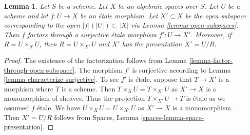 \documentclass[10pt,a4paper]{amsart}
\theoremstyle{plain}
\newtheorem{lemma}[subsection]{Lemma}
\theoremstyle{definition}
\theoremstyle{remark}
\numberwithin{equation}{subsection}
\begin{document}
\begin{lemma}
\label{lemma-etale-image-open}
Let $S$ be a scheme. Let $X$ be an algebraic spaces over $S$.
Let $U$ be a scheme and let $f : U \to X$ be an \'etale morphism.
Let $X' \subset X$ be the open subspace corresponding to
the open $|f|(|U|) \subset |X|$ via
Lemma \ref{lemma-open-subspaces}.
Then $f$ factors through a surjective \'etale morphism $f' : U \to X'$.
Moreover, if $R = U \times_X U$, then $R = U \times_{X'} U$ and $X'$ has
the presentation $X' = U/R$.
\end{lemma}

\begin{proof}
The existence of the factorization follows from
Lemma \ref{lemma-factor-through-open-subspace}.
The morphism $f'$ is surjective according to
Lemma \ref{lemma-characterize-surjective}.
To see $f'$ is \'etale, suppose that $T \to X'$ is a morphism
where $T$ is a scheme. Then $T \times_X U = T \times_{X'} U$
as $X' \to X$ is a monomorphism of sheaves. Thus the projection
$T \times_{X'} U \to T$ is \'etale as we assumed $f$ \'etale.
We have $U \times_X U = U \times_{X'} U$ as $X' \to X$ is a monomorphism.
Then $X' = U/R$ follows from
Spaces, Lemma \ref{spaces-lemma-space-presentation}.
\end{proof}
\end{document}
